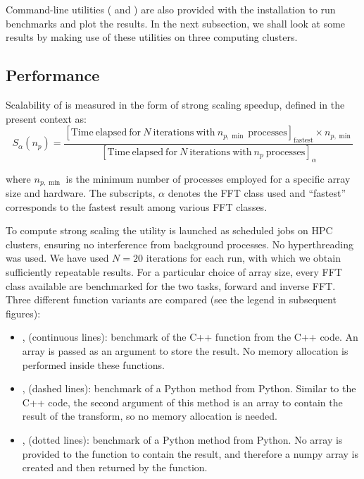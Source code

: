 Command-line utilities ( and
) are also provided with the 
installation to run benchmarks and plot the results. In the next subsection, we
shall look at some results by making use of these utilities on three computing
clusters.

\subsection{Performance}



Scalability of  is measured in the form of strong scaling speedup,
defined in the present context as:
\begin{equation*}
S_\alpha(n_p) = \frac
{[\mathrm{Time\ elapsed\ for\ } N \mathrm{\ iterations\ with\ }n_{p,\min}\mathrm{\ processes}]_{\mathrm{fastest}}
\times n_{p,\min}}
{[\mathrm{Time\ elapsed\ for\ } N \mathrm{\ iterations\ with\ } n_p \mathrm{\
processes}]_\alpha}
\label{eq:speedup}
\end{equation*}

where $n_{p,\min}$ is the minimum number of processes employed for a specific
array size and hardware. The subscripts, $\alpha$ denotes the FFT class used and
``fastest'' corresponds to the fastest result among various FFT classes.

To compute strong scaling the utility  is launched
as scheduled jobs on HPC clusters, ensuring no interference from background
processes. No hyperthreading was used.
%
We have used $N=20$ iterations for each run, with which we obtain sufficiently
repeatable results.
%
For a particular choice of array size, every FFT class available are
benchmarked for the two tasks, forward and inverse FFT. Three different function
variants are compared (see the legend in subsequent figures):

\begin{itemize}

\item {},  (continuous lines): benchmark
of the C++ function from the C++ code. An array is passed as an argument to store
the result. No memory allocation is performed inside these functions.

\item {},  (dashed lines):
benchmark of a Python method from Python. Similar to the C++ code, the second
argument of this method is an array to contain the result of the transform, so no
memory allocation is needed.

\item {},  (dotted lines):
benchmark of a Python method from Python. No array is provided to the function to
contain the result, and therefore a numpy array is created and then returned by
the function.

\end{itemize}

